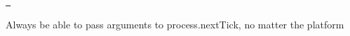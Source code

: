 \href{https://travis-ci.org/calvinmetcalf/process-nextick-args}{\texttt{ }}


\begin{DoxyCode}{0}

\end{DoxyCode}


Always be able to pass arguments to process.\+next\+Tick, no matter the platform


\begin{DoxyCode}{0}
\DoxyCodeLine{}

\end{DoxyCode}
 